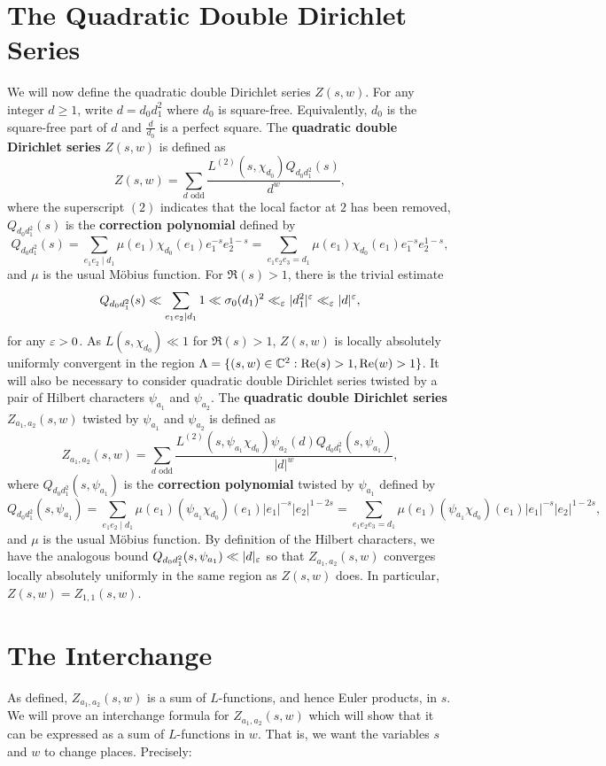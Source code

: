 \documentclass[12pt,reqno,oneside]{amsart}
\begin{document}
\section*{The Quadratic Double Dirichlet Series}
    We will now define the quadratic double Dirichlet series $Z(s,w)$. For any integer $d \ge 1$, write $d = d_{0}d_{1}^{2}$ where $d_{0}$ is square-free. Equivalently, $d_{0}$ is the square-free part of $d$ and $\frac{d}{d_{0}}$ is a perfect square. The \textbf{quadratic double Dirichlet series} $Z(s,w)$ is defined as
    \[
        Z(s,w) = \sum_{\text{$d$ odd}}\frac{L^{(2)}(s,\chi_{d_{0}})Q_{d_{0}d_{1}^{2}}(s)}{d^{w}},
    \]
    where the superscript $(2)$ indicates that the local factor at $2$ has been removed, $Q_{d_{0}d_{1}^{2}}(s)$ is the \textbf{correction polynomial} defined by
    \[
        Q_{d_{0}d_{1}^{2}}(s) = \sum_{e_{1}e_{2} \mid d_{1}}\mu(e_{1})\chi_{d_{0}}(e_{1})e_{1}^{-s}e_{2}^{1-s} = \sum_{e_{1}e_{2}e_{3} = d_{1}}\mu(e_{1})\chi_{d_{0}}(e_{1})e_{1}^{-s}e_{2}^{1-s},
    \]
    and $\mu$ is the usual M\"obius function. For $\Re(s) > 1$, there is the trivial estimate
    \[
        Q_{d_{0}d_{1}^{2}}(s) \ll \sum_{e_{1}e_{2} \mid d_{1}}1 \ll \sigma_{0}(d_{1})^{2} \ll_{\varepsilon} |d_{1}^{2}|^{\varepsilon} \ll_{\varepsilon} |d|^{\varepsilon},
    \]
     for any $\varepsilon > 0$. As $L(s,\chi_{d_{0}}) \ll 1$ for $\Re(s) > 1$, $Z(s,w)$ is locally absolutely uniformly convergent in the region $\Lambda = \{(s,w) \in \mathbb{C}^{2}:\mathrm{Re}(s) > 1, \mathrm{Re}(w) > 1\}$. It will also be necessary to consider quadratic double Dirichlet series twisted by a pair of Hilbert characters $\psi_{a_{1}}$ and $\psi_{a_{2}}$. The \textbf{quadratic double Dirichlet series} $Z_{a_{1},a_{2}}(s,w)$ twisted by $\psi_{a_{1}}$ and $\psi_{a_{2}}$ is defined as
    \[
        Z_{a_{1},a_{2}}(s,w) = \sum_{\text{$d$ odd}}\frac{L^{(2)}(s,\psi_{a_{1}}\chi_{d_{0}})\psi_{a_{2}}(d)Q_{d_{0}d_{1}^{2}}(s,\psi_{a_{1}})}{|d|^{w}},
    \]
    where $Q_{d_{0}d_{1}^{2}}(s,\psi_{a_{1}})$ is the \textbf{correction polynomial} twisted by $\psi_{a_{1}}$ defined by
    \[
        Q_{d_{0}d_{1}^{2}}(s,\psi_{a_{1}}) = \sum_{e_{1}e_{2} \mid d_{1}}\mu(e_{1})(\psi_{a_{1}}\chi_{d_{0}})(e_{1})|e_{1}|^{-s}|e_{2}|^{1-2s} = \sum_{e_{1}e_{2}e_{3} = d_{1}}\mu(e_{1})(\psi_{a_{1}}\chi_{d_{0}})(e_{1})|e_{1}|^{-s}|e_{2}|^{1-2s},
    \]
    and $\mu$ is the usual M\"obius function. By definition of the Hilbert characters, we have the analogous bound $Q_{d_{0}d_{1}^{2}}(s,\psi_{a_{1}}) \ll |d|_{\varepsilon}$ so that $Z_{a_{1},a_{2}}(s,w)$ converges locally absolutely uniformly in the same region as $Z(s,w)$ does. In particular, $Z(s,w) = Z_{1,1}(s,w)$.
\section*{The Interchange}
    As defined, $Z_{a_{1},a_{2}}(s,w)$ is a sum of $L$-functions, and hence Euler products, in $s$. We will prove an interchange formula for $Z_{a_{1},a_{2}}(s,w)$ which will show that it can be expressed as a sum of $L$-functions in $w$. That is, we want the variables $s$ and $w$ to change places. Precisely:
\end{document}

